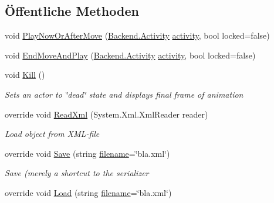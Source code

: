 \subsection*{Öffentliche Methoden}
\begin{DoxyCompactItemize}
\item 
void \hyperlink{class_gruppe22_1_1_client_1_1_actor_view_af0bf5a4427fcaf23ac0af9f286f246e1}{Play\-Now\-Or\-After\-Move} (\hyperlink{namespace_gruppe22_1_1_backend_aaa25d27da5307e9abb21f9f09b528f67}{Backend.\-Activity} \hyperlink{class_gruppe22_1_1_client_1_1_actor_view_af7f1f3741a7266476953b693df0067a2}{activity}, bool locked=false)
\item 
void \hyperlink{class_gruppe22_1_1_client_1_1_actor_view_a784d66744fea2c43f7a705c4bebb80a3}{End\-Move\-And\-Play} (\hyperlink{namespace_gruppe22_1_1_backend_aaa25d27da5307e9abb21f9f09b528f67}{Backend.\-Activity} \hyperlink{class_gruppe22_1_1_client_1_1_actor_view_af7f1f3741a7266476953b693df0067a2}{activity}, bool locked=false)
\item 
void \hyperlink{class_gruppe22_1_1_client_1_1_actor_view_abe6b2c58e6d9796f2a351af99689c9db}{Kill} ()
\begin{DoxyCompactList}\small\item\em Sets an actor to \char`\"{}dead\char`\"{} state and displays final frame of animation \end{DoxyCompactList}\item 
override void \hyperlink{class_gruppe22_1_1_client_1_1_actor_view_a1b068bd49a64ea380d700155ec9bda5e}{Read\-Xml} (System.\-Xml.\-Xml\-Reader reader)
\begin{DoxyCompactList}\small\item\em Load object from X\-M\-L-\/file \end{DoxyCompactList}\item 
override void \hyperlink{class_gruppe22_1_1_client_1_1_actor_view_a18566b8e88b63aa9901be779ebde09ab}{Save} (string \hyperlink{class_gruppe22_1_1_client_1_1_tile_set_afce49a3941b2d4a360990f9847282da1}{filename}=\char`\"{}bla.\-xml\char`\"{})
\begin{DoxyCompactList}\small\item\em Save (merely a shortcut to the serializer \end{DoxyCompactList}\item 
override void \hyperlink{class_gruppe22_1_1_client_1_1_actor_view_af94fec8c50c0919b4c762df7c681db4b}{Load} (string \hyperlink{class_gruppe22_1_1_client_1_1_tile_set_afce49a3941b2d4a360990f9847282da1}{filename}=\char`\"{}bla.\-xml\char`\"{})

\end{DoxyCompactItemize}
